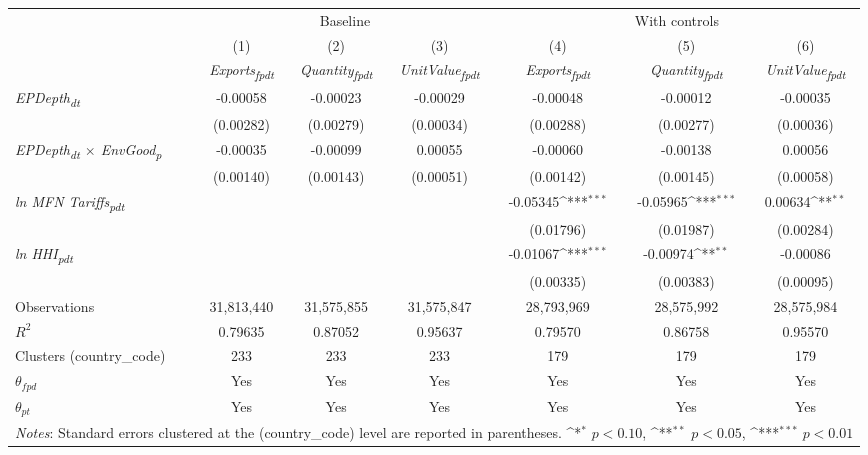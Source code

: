 {
\def\sym#1{\ifmmode^{#1}\else\(^{#1}\)\fi}
\begin{tabular}{l*{6}{c}}
\toprule
&\multicolumn{3}{c}{Baseline}&\multicolumn{3}{c}{With controls}\\\cmidrule(lr){2-4}\cmidrule(lr){5-7}
&(1)&(2)&(3)&(4)&(5)&(6)\\
&\textit{Exports\textsubscript{fpdt}}&\textit{Quantity\textsubscript{fpdt}}&\textit{UnitValue\textsubscript{fpdt}}&\textit{Exports\textsubscript{fpdt}}&\textit{Quantity\textsubscript{fpdt}}&\textit{UnitValue\textsubscript{fpdt}}\\
\midrule
\textit{EPDepth\textsubscript{dt}} & -0.00058 & -0.00023 & -0.00029 & -0.00048 & -0.00012 & -0.00035\\
 & (0.00282) & (0.00279) & (0.00034) & (0.00288) & (0.00277) & (0.00036)\\
\addlinespace
\textit{EPDepth\textsubscript{dt} $\times$ EnvGood\textsubscript{p}} & -0.00035 & -0.00099 & 0.00055 & -0.00060 & -0.00138 & 0.00056\\
 & (0.00140) & (0.00143) & (0.00051) & (0.00142) & (0.00145) & (0.00058)\\
\addlinespace
\textit{ln MFN Tariffs\textsubscript{pdt}} &  &  &  & -0.05345\sym{***} & -0.05965\sym{***} & 0.00634\sym{**}\\
 &  &  &  & (0.01796) & (0.01987) & (0.00284)\\
\addlinespace
\textit{ln HHI\textsubscript{pdt}} &  &  &  & -0.01067\sym{***} & -0.00974\sym{**} & -0.00086\\
 &  &  &  & (0.00335) & (0.00383) & (0.00095)\\
\midrule
Observations & 31,813,440 & 31,575,855 & 31,575,847 & 28,793,969 & 28,575,992 & 28,575,984\\
$R^{2}$ & 0.79635 & 0.87052 & 0.95637 & 0.79570 & 0.86758 & 0.95570\\
Clusters (country_code) & 233 & 233 & 233 & 179 & 179 & 179\\
$\theta_{fpd}$ & Yes & Yes & Yes & Yes & Yes & Yes\\
$\theta_{pt}$ & Yes & Yes & Yes & Yes & Yes & Yes\\
\bottomrule
\multicolumn{7}{l}{\footnotesize \textit{Notes}: Standard errors clustered at the (country_code) level are reported in parentheses. \sym{*} \(p<0.10\), \sym{**} \(p<0.05\), \sym{***} \(p<0.01\)}\\
\end{tabular}
}
